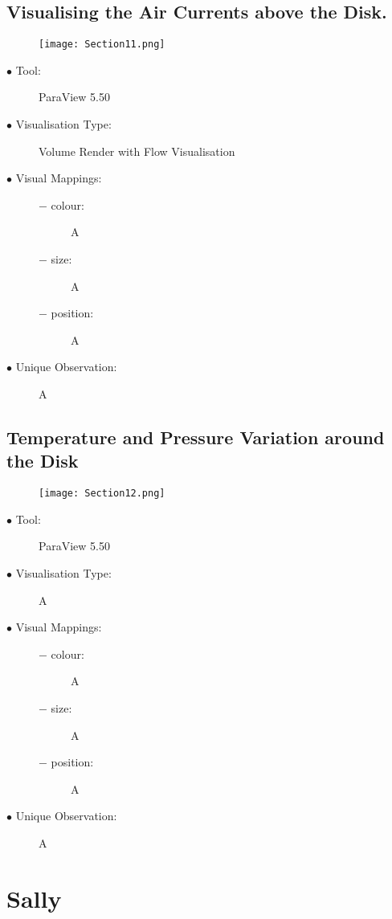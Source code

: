 \documentclass{article}
\begin{document}
\subsection{Visualising the Air Currents above the Disk.}
\begin{figure}[h]
	\centering
	\texttt{[image: Section11.png]}
\end{figure}
\begin{description}
	\item[$\bullet$ Tool:] ParaView 5.50
	\item[$\bullet$ Visualisation Type:] Volume Render with Flow Visualisation
	\item[$\bullet$ Visual Mappings:] \hfill
		\begin{description}
			\item[$-$ colour:] A
			\item[$-$ size:] A
			\item[$-$ position:] A
		\end{description}
	\item[$\bullet$ Unique Observation:] A
\end{description}
\newpage

\subsection{Temperature and Pressure Variation around the Disk}
\begin{figure}[h]
	\centering
	\texttt{[image: Section12.png]}
\end{figure}
\begin{description}
	\item[$\bullet$ Tool:] ParaView 5.50
	\item[$\bullet$ Visualisation Type:] A
	\item[$\bullet$ Visual Mappings:] \hfill
		\begin{description}
			\item[$-$ colour:] A
			\item[$-$ size:] A
			\item[$-$ position:] A
		\end{description}
	\item[$\bullet$ Unique Observation:] A
\end{description}
\newpage

\section{Sally}
\end{document}
